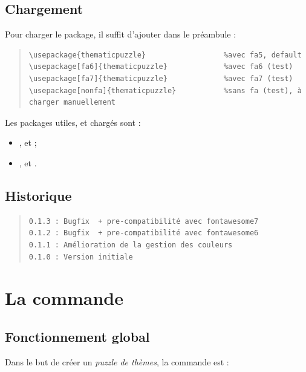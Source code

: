 \documentclass[11pt,a4paper]{ltxdoc}
\begin{document}
\subsection{Chargement}

Pour charger le package, il suffit d'ajouter dans le préambule :

\begin{quote}
\begin{verbatim}
\usepackage{thematicpuzzle}                  %avec fa5, default
\usepackage[fa6]{thematicpuzzle}             %avec fa6 (test)
\usepackage[fa7]{thematicpuzzle}             %avec fa7 (test)
\usepackage[nonfa]{thematicpuzzle}           %sans fa (test), à charger manuellement
\end{verbatim}
\end{quote}

Les packages utiles, et chargés sont :

\begin{itemize}
	\item {},  et  ;
	\item {},  et .
\end{itemize}

\vfill

\subsection{Historique}

\begin{quote}
\begin{verbatim}
0.1.3 : Bugfix  + pre-compatibilité avec fontawesome7
0.1.2 : Bugfix  + pre-compatibilité avec fontawesome6
0.1.1 : Amélioration de la gestion des couleurs
0.1.0 : Version initiale
\end{verbatim}
\end{quote}

\pagebreak

\section{La commande}

\subsection{Fonctionnement global}

Dans le but de créer un \textit{puzzle de thèmes}, la commande est :
\end{document}
